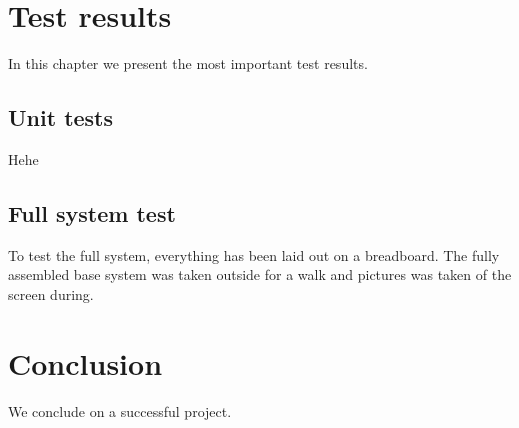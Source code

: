 \chapter{Test results}
In this chapter we present the most important test results.\\
\section{Unit tests}
Hehe

\section{Full system test}
To test the full system, everything has been laid out on a breadboard. The fully assembled base system was taken outside for a walk and pictures was taken of the screen during. 




\chapter{Conclusion}
We conclude on a successful project.


